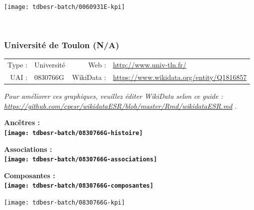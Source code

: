 \documentclass[12pt,french,]{article}
\begin{document}
\begin{center}\texttt{[image: tdbesr-batch/0060931E-kpi]} \end{center}\checkoddpage

\ifoddpage \fi ~\newpage  

\hypertarget{universituxe9-de-toulon-na}{%
\subsubsection{Université de Toulon
(N/A)}\label{universituxe9-de-toulon-na}}

\begin{tabular*}{\textwidth}{rp{5cm}rl}  
\hline  
Type : & Université & Web : &\href{http://www.univ-tln.fr/}{http://www.univ-tln.fr/} \\  
UAI : & 0830766G & WikiData : & \href{https://www.wikidata.org/entity/Q1816857}{https://www.wikidata.org/entity/Q1816857} \\  
\hline  
\end{tabular*}

\textit{\scriptsize Pour améliorer ces graphiques, veuillez éditer WikiData selon ce guide :  \href{https://github.com/cpesr/wikidataESR/blob/master/Rmd/wikidataESR.md}{https://github.com/cpesr/wikidataESR/blob/master/Rmd/wikidataESR.md}}
.

\vspace{1cm}  
\begin{minipage}[b]{0.50\textwidth}\begin{center} \bf Ancêtres : \\  
\texttt{[image: tdbesr-batch/0830766G-histoire]} \end{center}\end{minipage}\begin{minipage}[b]{0.50\textwidth}\begin{center} \bf Associations : \\  
\texttt{[image: tdbesr-batch/0830766G-associations]} \end{center}\end{minipage}

\hrulefill

\begin{center} \bf Composantes : \\  
\texttt{[image: tdbesr-batch/0830766G-composantes]} \end{center}

\begin{center}\texttt{[image: tdbesr-batch/0830766G-kpi]} \end{center}\checkoddpage
\end{document}
